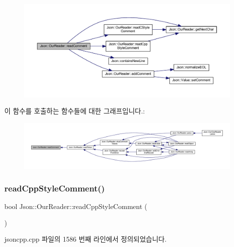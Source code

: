\begin{figure}[H]
\begin{center}
\leavevmode
\includegraphics[width=350pt]{class_json_1_1_our_reader_a90f6bb9e55b2bc3d6c1880809495c222_cgraph}
\end{center}
\end{figure}
이 함수를 호출하는 함수들에 대한 그래프입니다.\+:\nopagebreak
\begin{figure}[H]
\begin{center}
\leavevmode
\includegraphics[width=350pt]{class_json_1_1_our_reader_a90f6bb9e55b2bc3d6c1880809495c222_icgraph}
\end{center}
\end{figure}
\mbox{\label{class_json_1_1_our_reader_ae3de80671f0f997053e1c1c8a47a45c5}} 
\subsubsection{\texorpdfstring{read\+Cpp\+Style\+Comment()}{readCppStyleComment()}}
{\footnotesize\ttfamily bool Json\+::\+Our\+Reader\+::read\+Cpp\+Style\+Comment (\begin{DoxyParamCaption}{ }\end{DoxyParamCaption})\hspace{0.3cm}{\ttfamily [private]}}



jsoncpp.\+cpp 파일의 1586 번째 라인에서 정의되었습니다.


